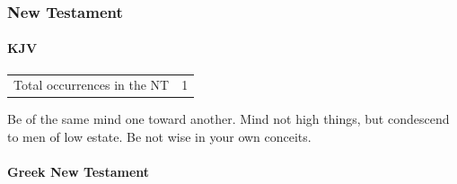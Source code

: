 			
		
		
	\subsubsection{New Testament} %
		\label{CONDESCENSION-NT}
	
		\paragraph{KJV}
			\label{CONDESCENSION-NT-KJV}
			
	
			\begin{tabular}{ll}
				Total occurrences in the NT & 1
			\end{tabular}
			
			\begin{compactdesc}
				\item[Romans 12:16] Be of the same mind one toward another.  Mind not high things, but condescend to men of low estate.  Be not wise in your own conceits.
			\end{compactdesc}
			
		\paragraph{Greek New Testament} %
			\label{CONDESCENSION-GREEK}
		
			\subparagraph{\texorpdfstring{}{}}
				\label{SUNAPAGO}
			
